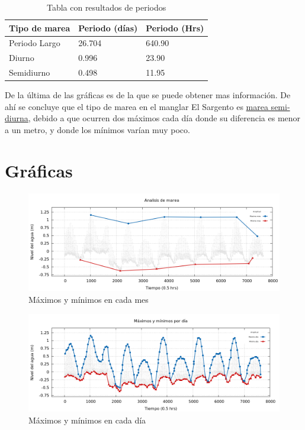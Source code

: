 \documentclass[paper=letter, fontsize=12pt,spanish]{article}
\begin{document}
\begin{table}[ht!]
\centering 
\begin{tabular}{l l l}
\toprule

           Tipo de marea & Periodo (días)  &  Periodo (Hrs)  \\ \midrule
		   Periodo Largo & 26.704 & 640.90 \\         
           Diurno & 0.996 & 23.90 \\ 
           Semidiurno & 0.498 & 11.95 \\
         \bottomrule
        
    \end{tabular}

\caption {Tabla con resultados de periodos} \label{tab:title}  
\end{table}

De la última de las gráficas es de la que se puede obtener mas información. De ahí se concluye que el tipo de marea en el manglar El Sargento es \underline{marea semi-diurna}, debido a que ocurren dos máximos cada día donde su diferencia es menor a un metro, y donde los mínimos varían muy poco.





\section{Gr\'aficas}

\begin{figure}[ht!]
\centering
\includegraphics[scale=0.42]{mes}
\caption{M\'aximos y m\'inimos en cada mes}\label{resupsim}
\end{figure}


\begin{figure}[ht!]
\centering
\includegraphics[scale=0.42]{dias}
\caption{M\'aximos y m\'inimos en cada día}\label{resupsim}
\end{figure}
\end{document}
